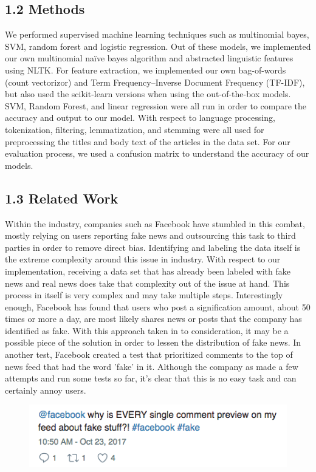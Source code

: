 \documentclass{neu_handout}
\begin{document}
\subsection*{1.2 Methods}
We performed supervised machine learning techniques such as multinomial bayes, SVM, random forest and logistic regression. Out of these models, we implemented our own multinomial na\"ive bayes algorithm and abstracted linguistic features using NLTK. For feature extraction, we implemented our own bag-of-words (count vectorizor) and Term Frequency–Inverse Document Frequency (TF-IDF), but also used the scikit-learn versions when using the out-of-the-box models. SVM, Random Forest, and linear regression were all run in order to compare the accuracy and output to our model. With respect to language processing, tokenization, filtering, lemmatization, and stemming were all used for preprocessing the titles and body text of the articles in the data set. For our evaluation process, we used a confusion matrix to understand the accuracy of our models.

\subsection*{1.3 Related Work}
Within the industry, companies such as Facebook have stumbled in this combat, mostly relying on users reporting fake news and outsourcing this task to third parties in order to remove direct bias. Identifying and labeling the data itself is the extreme complexity around this issue in industry. With respect to our implementation, receiving a data set that has already been labeled with fake news and real news does take that complexity out of the issue at hand. This process in itself is very complex and may take multiple steps. Interestingly enough, Facebook has found that users who post a signification amount, about 50 times or more a day, are most likely shares news or posts that the company has identified as fake. With this approach taken in to consideration, it may be a possible piece of the solution in order to lessen the distribution of fake news. In another test, Facebook created a test that prioritized comments to the top of news feed that had the word 'fake' in it. Although the company as made a few attempts and run some tests so far, it's clear that this is no easy task and can certainly annoy users.

\begin{figure}[h]
\centering
{
\includegraphics[width=0.3\linewidth]{fbfake}
}
\end{figure}
\end{document}
